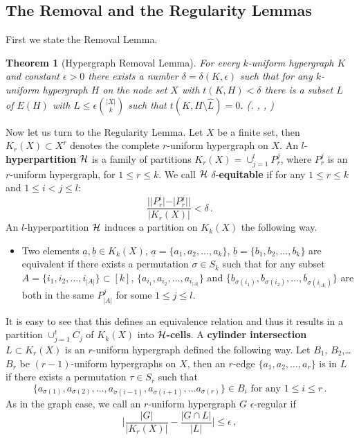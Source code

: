 \documentclass [11pt] {article}
\newtheorem{theorem}{Theorem}
\def\e{\epsilon}
\def\cH{\mbox{$\cal H$}}
\begin{document}
\subsection{The Removal and the Regularity Lemmas}\label{RRL}
First we state the Removal Lemma.
\begin{theorem}[Hypergraph Removal Lemma] \label{removallemma}
 For every $k$-uniform hypergraph $K$
  and constant $\epsilon>0$ there exists
 a number $\delta=\delta(K,\epsilon)$ such
  that for any $k$-uniform hypergraph $H$ on the node set $X$ with
  $t(K,H)<\delta$ there is a subset $L$ of $E(H)$ with $L\leq
  \epsilon{{|X|}\choose{k}}$ such that $t(K,H\setminus \hat{L})=0$. 
(\cite{Gow}.
\cite{Ish}, \cite{NRS}, \cite{Tao})
\end{theorem}
Now let us turn to the Regularity Lemma.
 Let $X$ be a finite set, then
$K_r(X)\subset X^r$ denotes the complete $r$-uniform hypergraph on $X$.
An $l$-{\bf hyperpartition} $\cH$ is a family of partitions
$K_r(X)=\cup^l_{j=1} P^j_r$, where $P^j_r$
is an $r$-uniform hypergraph, for $1\leq r \leq k$.
We call $\cH$ $\delta$-{\bf equitable}
if for any $1\leq r \leq k$ and $1\leq i< j \leq l$:
$$\frac{||P^i_r|-|P^j_r||}{|K_r(X)|} <\delta\,.$$
An $l$-hyperpartition $\cH$ induces a partition on $K_k(X)$ the following
way.
\begin{itemize}
\item
Two elements $\underline{a},\underline{b}\in K_k(X)$,
$\underline{a}=\{a_1, a_2,\dots, a_k\}$,
$\underline{b}=\{b_1, b_2,\dots, b_k\}$ are equivalent if there exists
a permutation $\sigma\in S_k$ such that for any subset
$A=\{i_1, i_2,\dots,
i_{|A|}\}\subset [k]$, $\{a_{i_1}, a_{i_2},
\dots, a_{i_{|A|}}\}$  and $\{b_{\sigma(i_1)}, b_{\sigma(i_2)},
\dots, b_{\sigma(i_{|A|})}\}$ are both in the same $P^j_{|A|}$ for some
$1\leq j \leq l$.
\end{itemize}
 It is easy to see that this defines an equivalence
relation and thus it results in a partition $\cup^t_{j=1} C_j$
of $K_k(X)$ into {\bf $\cH$-cells}.
A {\bf cylinder intersection} $L\subset K_r(X)$ is an $r$-uniform hypergraph
defined the following way. Let $B_1$, $B_2$,\dots $B_r$ be
$(r-1)$-uniform hypergraphs on $X$, then an $r$-edge $\{a_1, a_2,\dots, a_r\}$
is in $L$ if there exists a permutation $\tau\in S_r$ such that
$$\{a_{\sigma(1)}, a_{\sigma(2)},\dots, a_{\sigma(i-1)}, a_{\sigma(i+1)},
\dots a_{\sigma(r)}\}\in B_i\,\,\mbox{for any $1\leq i \leq r$}\,.$$
As in the graph case, we call an $r$-uniform hypergraph $G$ $\e$-regular if
$$\Big|\frac{|G|}{|K_r(X)|}-\frac{|G\cap L|}{|L|}\Big| \leq \e\,,$$
\end{document}
